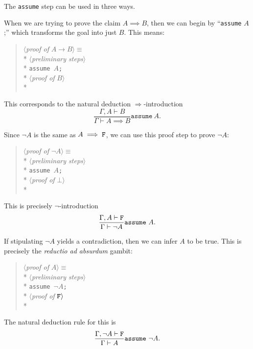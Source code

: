 \begin{node}[Assume]\label{mizar-0005}%
The \texttt{assume} step can be used in three ways.

\begin{node}\label{mizar-0006}%
When we are trying to prove the claim $A\implies B$, then we can begin
by ``\texttt{assume} $A$;'' which transforms the goal into just
$B$. This means:
\begin{verse}
$\langle$\emph{proof of \/}$A\to B\rangle \equiv$\\*
\qquad $\langle$\emph{preliminary steps\/}$\rangle$\\*
\qquad \texttt{assume }$A$\texttt{;}\\*
\qquad $\langle$\emph{proof of \/}$B\rangle$\\*
\end{verse}
This corresponds to the natural deduction $\Longrightarrow$-introduction
\[\frac{\Gamma,A\vdash B}{\Gamma\vdash A\implies B}\mathtt{assume}~A.\]
\end{node}

\begin{node}\label{mizar-0007}%
Since $\neg A$ is the same as $A\implies\mathtt{F}$, we can use this proof
step to prove $\neg A$:
\begin{verse}
$\langle$\emph{proof of \/}$\neg A\rangle \equiv$\\*
\qquad $\langle$\emph{preliminary steps\/}$\rangle$\\*
\qquad \texttt{assume }$A$\texttt{;}\\*
\qquad $\langle$\emph{proof of \/}$\bot\rangle$\\*
\end{verse}
This is precisely $\neg$-introduction
\[\frac{\Gamma,A\vdash\mathtt{F}}{\Gamma\vdash\neg A}\mathtt{assume}~A.\]
\end{node}

\begin{node}\label{mizar-0008}%
If stipulating $\neg A$ yields a contradiction, then we can infer $A$ to
be true. This is precisely the \emph{reductio ad absurdum} gambit:
\begin{verse}
$\langle$\emph{proof of \/}$A\rangle \equiv$\\*
\qquad $\langle$\emph{preliminary steps\/}$\rangle$\\*
\qquad \texttt{assume }$\neg A$\texttt{;}\\*
\qquad $\langle$\emph{proof of \/}$\mathtt{F}\rangle$\\*
\end{verse}
The natural deduction rule for this is
\[\frac{\Gamma,\neg A\vdash\mathtt{F}}{\Gamma\vdash A}\mathtt{assume}~\neg A.\]
\end{node}
\end{node}


